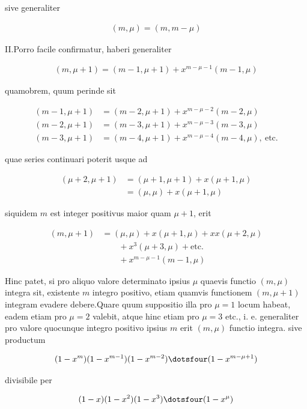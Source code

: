 sive generaliter

\[
\begin{aligned}
(m,\mu)=(m,m-\mu)
\end{aligned}
\]

II.\quad Porro facile confirmatur, haberi generaliter

\[
\begin{aligned}
(m,\mu+1)=(m-1,\mu+1)+x^{m-\mu-1}(m-1,\mu)
\end{aligned}
\]

quamobrem, quum perinde sit

\[
\begin{aligned}
(m-1,\mu+1)&=(m-2,\mu+1)+x^{m-\mu-2}(m-2,\mu)\\
(m-2,\mu+1)&=(m-3,\mu+1)+x^{m-\mu-3}(m-3,\mu)\\
(m-3,\mu+1)&=(m-4,\mu+1)+x^{m-\mu-4}(m-4,\mu),\ \text{etc.}
\end{aligned}
\]

quae series continuari poterit usque ad

\[
\begin{aligned}
(\mu+2,\mu+1)&=(\mu+1,\mu+1)+x(\mu+1,\mu)\\
&=(\mu,\mu)+x(\mu+1,\mu)
\end{aligned}
\]

siquidem $m$ est integer positivus maior quam $\mu+1$, erit

\[
\begin{aligned}
(m,\mu+1)&=(\mu,\mu)+x(\mu+1,\mu)+xx(\mu+2,\mu)\\
&\qquad+x^3(\mu+3,\mu)+\text{etc.}\\
&\qquad+x^{m-\mu-1}(m-1,\mu)
\end{aligned}
\]

Hinc patet, si pro aliquo valore determinato ipsius $\mu$ quaevis functio $(m,\mu)$ integra sit, existente $m$ integro positivo, etiam quamvis functionem $(m,\mu+1)$ integram evadere debere.\quad Quare quum suppositio illa pro $\mu=1$ locum habeat, eadem etiam pro $\mu=2$ valebit, atque hinc etiam pro $\mu=3$ etc., i. e. generaliter pro valore quocunque integro positivo ipsius $m$ erit $(m,\mu)$ functio integra. sive productum

\[
\begin{aligned}
(1-x^m)(1-x^{m-1})(1-x^{m-2})\dotsfour(1-x^{m-\mu+1})
\end{aligned}
\]

divisibile per

\[
\begin{aligned}
(1-x)(1-x^2)(1-x^3)\dotsfour(1-x^\mu)
\end{aligned}
\]

